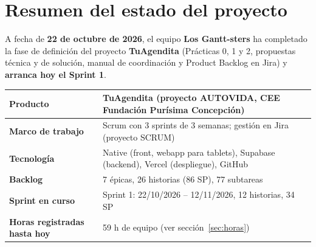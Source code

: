 \documentclass[11pt,a4paper]{article}
\newcommand{\hl}[1]{\textcolor{gblue}{\textbf{#1}}}
\begin{document}
\section{Resumen del estado del proyecto}
A fecha de \hl{22 de octubre de 2026}, el equipo \hl{Los Gantt-sters} ha completado la fase de definición del proyecto \hl{TuAgendita} (Prácticas 0, 1 y 2, propuestas técnica y de solución, manual de coordinación y Product Backlog en Jira) y \hl{arranca hoy el Sprint 1}.

\begin{longtable}{|P{5.2cm}|P{9.8cm}|}
\hline
{}\textbf{\color{gblue}Producto} & TuAgendita (proyecto AUTOVIDA, CEE Fundación Purísima Concepción) \\ \hline
{}\textbf{\color{gblue}Marco de trabajo} & Scrum con 3 sprints de 3 semanas; gestión en Jira (proyecto SCRUM) \\ \hline
{}\textbf{\color{gblue}Tecnología} & Native (front, webapp para tablets), Supabase (backend), Vercel (despliegue), GitHub \\ \hline
{}\textbf{\color{gblue}Backlog} & 7 épicas, 26 historias (86 SP), 77 subtareas \\ \hline
{}\textbf{\color{gblue}Sprint en curso} & Sprint 1: 22/10/2026 -- 12/11/2026, 12 historias, 34 SP \\ \hline
{}\textbf{\color{gblue}Horas registradas hasta hoy} & 59 h de equipo (ver sección~\ref{sec:horas}) \\ \hline
\end{longtable}
\end{document}
